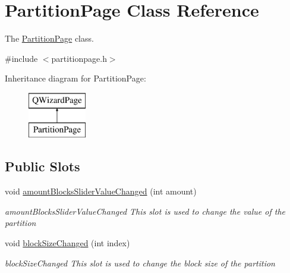 \hypertarget{class_partition_page}{}\section{Partition\+Page Class Reference}
\label{class_partition_page}


The \mbox{\hyperlink{class_partition_page}{Partition\+Page}} class.  




{\ttfamily \#include $<$partitionpage.\+h$>$}

Inheritance diagram for Partition\+Page\+:\begin{figure}[H]
\begin{center}
\leavevmode
\includegraphics[height=2.000000cm]{class_partition_page}
\end{center}
\end{figure}
\subsection*{Public Slots}
\begin{DoxyCompactItemize}
\item 
void \mbox{\hyperlink{class_partition_page_a0160f5f4dd1dcc377dc7a2f1db732f24}{amount\+Blocks\+Slider\+Value\+Changed}} (int amount)
\begin{DoxyCompactList}\small\item\em amount\+Blocks\+Slider\+Value\+Changed This slot is used to change the value of the partition \end{DoxyCompactList}\item 
void \mbox{\hyperlink{class_partition_page_aa90723be1956b54ce182cc64b3b4ce6f}{block\+Size\+Changed}} (int index)
\begin{DoxyCompactList}\small\item\em block\+Size\+Changed This slot is used to change the block size of the partition \end{DoxyCompactList}\end{DoxyCompactItemize}
